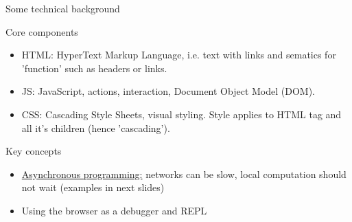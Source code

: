 \documentclass[10pt]{beamer}
\begin{document}
\begin{frame}{Some technical background}

    {\LARGE Core components}

    \begin{itemize}
        \item {\large HTML:} HyperText Markup Language, i.e. text with links and sematics for 'function' such as headers or links.
        \item {\large JS:} JavaScript, actions, interaction, Document Object Model (DOM).
        \item {\large CSS:} Cascading Style Sheets, visual styling. Style applies to HTML tag and all it's children (hence 'cascading').
    \end{itemize}
    \vspace{2em}

    {\LARGE Key concepts}

    \begin{itemize}
        \item \underline{Asynchronous programming:} networks can be slow, local computation should not wait (examples in next slides)
        \item Using the browser as a debugger and REPL
    \end{itemize}
\end{frame}

\end{document}
